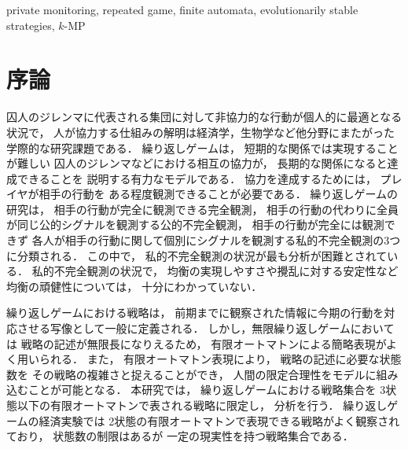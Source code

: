 \documentclass[submit]{ipsj}
\theoremstyle{definition}
\begin{document}
\begin{ekeyword}
  private monitoring, repeated game, finite automata, evolutionarily stable strategies, $k$-MP
\end{ekeyword}

\maketitle

\section{序論} \label{sec:introduction}

囚人のジレンマに代表される集団に対して非協力的な行動が個人的に最適となる状況で，
人が協力する仕組みの解明は経済学，生物学など他分野にまたがった
学際的な研究課題である．
繰り返しゲームは，
短期的な関係では実現することが難しい
囚人のジレンマなどにおける相互の協力が，
長期的な関係になると達成できることを
説明する有力なモデルである．
協力を達成するためには，
プレイヤが相手の行動を
ある程度観測できることが必要である．
繰り返しゲームの研究は，
相手の行動が完全に観測できる完全観測，
相手の行動の代わりに全員が同じ公的シグナルを観測する公的不完全観測，
相手の行動が完全には観測できず
各人が相手の行動に関して個別にシグナルを観測する私的不完全観測の3つに分類される．
この中で，
私的不完全観測の状況が最も分析が困難とされている\cite{Kandori-2015,Sugaya-2022}．
私的不完全観測の状況で，
均衡の実現しやすさや攪乱に対する安定性など均衡の頑健性については，
十分にわかっていない．

繰り返しゲームにおける戦略は，
前期までに観察された情報に今期の行動を対応させる写像として一般に定義される．
しかし，無限繰り返しゲームにおいては
戦略の記述が無限長になりえるため，
有限オートマトンによる簡略表現がよく用いられる\cite{muto-2013}．
また，
有限オートマトン表現により，
戦略の記述に必要な状態数を
その戦略の複雑さと捉えることができ，
人間の限定合理性をモデルに組み込むことが可能となる\cite{Rubinstein-1986}．
本研究では，
繰り返しゲームにおける戦略集合を
3状態以下の有限オートマトンで表される戦略に限定し，
分析を行う．
繰り返しゲームの経済実験では
2状態の有限オートマトンで表現できる戦略がよく観察されており，
状態数の制限はあるが
一定の現実性を持つ戦略集合である\cite{DalBo-2011}．
\end{document}

